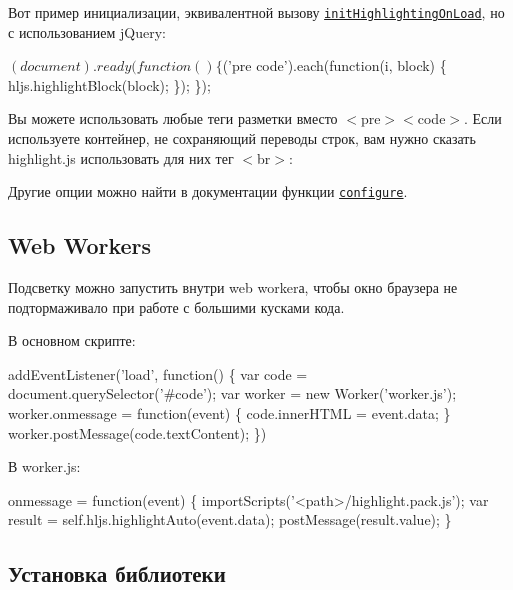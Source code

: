 Вот пример инициализации, эквивалентной вызову \href{http://highlightjs.readthedocs.io/en/latest/api.html#inithighlightingonload}{\tt {\ttfamily init\+Highlighting\+On\+Load}}, но с использованием j\+Query\+:


\begin{DoxyCode}
$(document).ready(function() \{
  $('pre code').each(function(i, block) \{
    hljs.highlightBlock(block);
  \});
\});
\end{DoxyCode}


Вы можете использовать любые теги разметки вместо {\ttfamily $<$pre$>$$<$code$>$}. Если используете контейнер, не сохраняющий переводы строк, вам нужно сказать highlight.\+js использовать для них тег {\ttfamily $<$br$>$}\+:




Другие опции можно найти в документации функции \href{http://highlightjs.readthedocs.io/en/latest/api.html#configure-options}{\tt {\ttfamily configure}}.

\subsection*{Web Workers}

Подсветку можно запустить внутри web worker\textquotesingle{}а, чтобы окно браузера не подтормаживало при работе с большими кусками кода.

В основном скрипте\+:


\begin{DoxyCode}
addEventListener('load', function() \{
  var code = document.querySelector('#code');
  var worker = new Worker('worker.js');
  worker.onmessage = function(event) \{ code.innerHTML = event.data; \}
  worker.postMessage(code.textContent);
\})
\end{DoxyCode}


В worker.\+js\+:


\begin{DoxyCode}
onmessage = function(event) \{
  importScripts('<path>/highlight.pack.js');
  var result = self.hljs.highlightAuto(event.data);
  postMessage(result.value);
\}
\end{DoxyCode}


\subsection*{Установка библиотеки}

